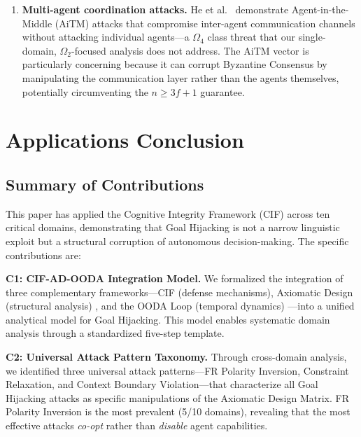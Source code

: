 \documentclass[
]{article}
\begin{document}
\begin{enumerate}
  rates on real MCP server deployments, suggesting that the boundary
  between tool integration and data ingestion may itself constitute a
  novel adversary class between \(\Omega_2\) and \(\Omega_3\).
\item
  \textbf{Multi-agent coordination attacks.} He et
  al.~\cite{he2025redteaming} demonstrate Agent-in-the-Middle (AiTM)
  attacks that compromise inter-agent communication channels without
  attacking individual agents---a \(\Omega_4\) class threat that our
  single-domain, \(\Omega_2\)-focused analysis does not address. The
  AiTM vector is particularly concerning because it can corrupt
  Byzantine Consensus by manipulating the communication layer rather
  than the agents themselves, potentially circumventing the
  \(n \geq 3f+1\) guarantee.
\end{enumerate}

\newpage

\section{Applications Conclusion}\label{sec:applications_conclusion}

\subsection{Summary of Contributions}\label{summary-of-contributions}

This paper has applied the Cognitive Integrity Framework (CIF)
\cite{friedman2026cogsec1} across ten critical domains, demonstrating
that Goal Hijacking is not a narrow linguistic exploit but a structural
corruption of autonomous decision-making. The specific contributions
are:

\textbf{C1: CIF-AD-OODA Integration Model.} We formalized the
integration of three complementary frameworks---CIF (defense
mechanisms), Axiomatic Design (structural analysis)
\cite{suh2001axiomatic}, and the OODA Loop (temporal dynamics)
\cite{boyd1987patterns}---into a unified analytical model for Goal
Hijacking. This model enables systematic domain analysis through a
standardized five-step template.

\textbf{C2: Universal Attack Pattern Taxonomy.} Through cross-domain
analysis, we identified three universal attack patterns---FR Polarity
Inversion, Constraint Relaxation, and Context Boundary Violation---that
characterize all Goal Hijacking attacks as specific manipulations of the
Axiomatic Design Matrix. FR Polarity Inversion is the most prevalent
(5/10 domains), revealing that the most effective attacks \emph{co-opt}
rather than \emph{disable} agent capabilities.
\end{document}
